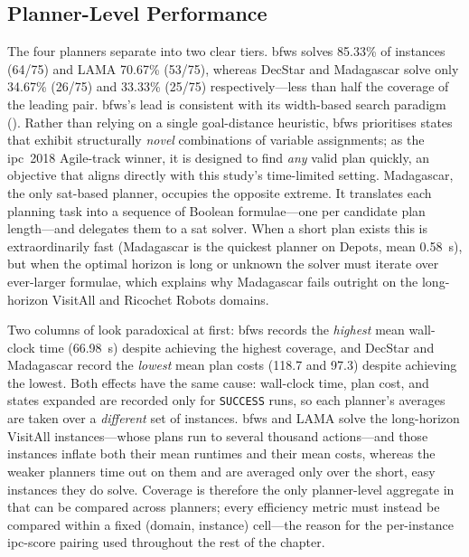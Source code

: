\subsection{Planner-Level Performance}
\label{sec:results:stage0:planners}

The four planners separate into two clear tiers.
\gls{bfws} solves 85.33\% of instances (64/75) and LAMA 70.67\% (53/75), whereas DecStar and Madagascar solve only 34.67\% (26/75) and 33.33\% (25/75) respectively---less than half the coverage of the leading pair.
\gls{bfws}'s lead is consistent with its width-based search paradigm ().
Rather than relying on a single goal-distance heuristic, \gls{bfws} prioritises states that exhibit structurally \emph{novel} combinations of variable assignments; as the \gls{ipc}~2018 Agile-track winner, it is designed to find \emph{any} valid plan quickly, an objective that aligns directly with this study's time-limited setting.
Madagascar, the only \gls{sat}-based planner, occupies the opposite extreme.
It translates each planning task into a sequence of Boolean formulae---one per candidate plan length---and delegates them to a \gls{sat} solver.
When a short plan exists this is extraordinarily fast (Madagascar is the quickest planner on Depots, mean 0.58~s), but when the optimal horizon is long or unknown the solver must iterate over ever-larger formulae, which explains why Madagascar fails outright on the long-horizon VisitAll and Ricochet Robots domains.

Two columns of  look paradoxical at first: \gls{bfws} records the \emph{highest} mean wall-clock time (66.98~s) despite achieving the highest coverage, and DecStar and Madagascar record the \emph{lowest} mean plan costs (118.7 and 97.3) despite achieving the lowest.
Both effects have the same cause: wall-clock time, plan cost, and states expanded are recorded only for \texttt{SUCCESS} runs, so each planner's averages are taken over a \emph{different} set of instances.
\gls{bfws} and LAMA solve the long-horizon VisitAll instances---whose plans run to several thousand actions---and those instances inflate both their mean runtimes and their mean costs, whereas the weaker planners time out on them and are averaged only over the short, easy instances they do solve.
Coverage is therefore the only planner-level aggregate in  that can be compared across planners; every efficiency metric must instead be compared within a fixed (domain, instance) cell---the reason for the per-instance \gls{ipc}-score pairing used throughout the rest of the chapter.

